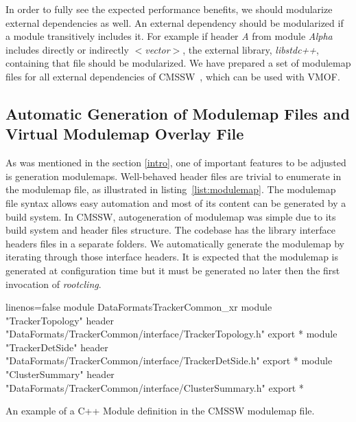 \documentclass[12pt]{iopart}
\begin{document}
In order to fully see the expected performance benefits, we should modularize external dependencies as well. An external dependency should be modularized if a module transitively includes it. For example if header \textit{A} from module \textit{Alpha} includes directly or indirectly \textit{$<$vector$>$}, the external library, \textit{libstdc++}, containing that file should be modularized. We have prepared a set of modulemap files for all external dependencies of CMSSW~\cite{raphael-auto-Modules}, which can be used with VMOF.

\subsection{Automatic Generation of Modulemap Files and Virtual Modulemap Overlay File}
\label{autogen}

As was mentioned in the section \ref{intro}, one of important features to be adjusted is generation modulemaps. Well-behaved header files are trivial to enumerate in the modulemap file, as illustrated in listing~\ref{list:modulemap}. The modulemap file syntax allows easy automation and most of its content can be generated by a build system. In CMSSW, autogeneration of modulemap was simple due to its build system and header files structure. The codebase has the library interface headers files in a separate folders. We automatically generate the modulemap by iterating through those interface headers. It is expected that the modulemap is generated at configuration time but it must be generated no later then the first invocation of \textit{rootcling}.

\begin{listing}[h]
\noindent
\begin{minipage}[h]{\textwidth}
\begin{cppcode*}{linenos=false}
module DataFormatsTrackerCommon_xr {
  module "TrackerTopology" {header "DataFormats/TrackerCommon/interface/TrackerTopology.h" export *}
  module "TrackerDetSide" {header "DataFormats/TrackerCommon/interface/TrackerDetSide.h" export *}
  module "ClusterSummary" {header "DataFormats/TrackerCommon/interface/ClusterSummary.h" export *}}
\end{cppcode*}
\end{minipage}
\caption{An example of a C++ Module definition in the CMSSW modulemap file.}
\label{list:modulemap}
\end{listing}
  
\end{document}
